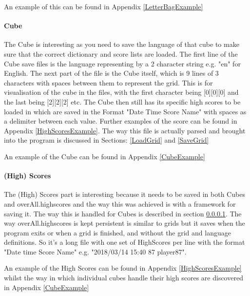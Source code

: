         An example of this can be found in Appendix \ref{LetterBagExample}
        \paragraph{Cube}\label{CubePersistance}
        The Cube is interesting as you need to save the language of that cube to make sure that the correct dictionary and score lists are loaded. The first line of the Cube save files is the language representing by a 2 character string e.g. "en" for English. The next part of the file is the Cube itself, which is 9 lines of 3 characters with spaces between them to represent the grid. This is for visualisation of the cube in the files, with the first character being [0][0][0] and the last being [2][2][2] etc. The Cube then still has its specific high scores to be loaded in which are saved in the Format "Date Time Score Name" with spaces as a delimiter between each value. Further examples of the score can be found in Appendix \ref{HighScoresExample}. The way this file is actually parsed and brought into the program is discussed in Sections: \ref{LoadGrid} and \ref{SaveGrid}
        
        An example of the Cube can be found in Appendix \ref{CubeExample}
        \paragraph{(High) Scores}\label{Scores}
        The (High) Scores part is interesting because it needs to be saved in both Cubes and overAll.highscores and the way this was achieved is with a framework for saving it. The way this is handled for Cubes is described in section \ref{CubePersistance}. The way overAll.highscores is kept persistent is similar to grids but it saves when the program exits or when a grid is finished, and without the grid and language definitions. So it's a long file with one set of HighScores per line with the format "Date time Score Name" e.g. "2018/03/14 15:40 87 player87".
        
        An example of the High Scores can be found in Appendix \ref{HighScoresExample} whilst the way in which individual cubes handle their high scores are discovered in Appendix \ref{CubeExample}